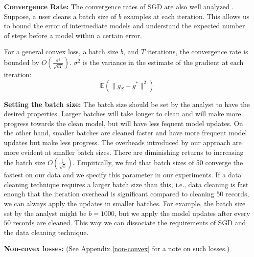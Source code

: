\vspace{0.25em}

\noindent\textbf{ Convergence Rate: } The convergence rates of SGD are also well analyzed \cite{dekel2012optimal,bertsekas2011incremental,zhao2014stochastic}. 
Suppose, a user cleans a batch size of $b$ examples at each iteration.
This allows us to bound the error of intermediate models and understand the expected number of steps before a model within a certain error. 

\begin{proposition}
For a general convex loss, a batch size $b$, and $T$ iterations, the convergence rate is bounded by $O(\frac{\sigma^2}{\sqrt{bT}})$. 
$\sigma^2$ is the variance in the estimate of the gradient at each iteration:
\[
\mathbb{E}(\|g_S - g^*\|^2)
\]
\end{proposition}

\vspace{0.25em}

\noindent\textbf{ Setting the batch size: } The batch size should be set by the analyst to have the desired properties.
Larger batches will take longer to clean and will make more progress towards the clean model, but will have less fequent model updates.
On the other hand, smaller batches are cleaned faster and have more frequent model updates but make less progress.
The overheads introduced by our approach are more evident at smaller batch sizes.
There are diminishing returns to increasing the batch size $O(\frac{1}{\sqrt{b}})$.
Empirically, we find that batch sizes of 50 converge the fastest on our data and we specify this parameter in our experiments.
If a data cleaning technique requires a larger batch size than this, i.e., data cleaning is fast enough that the iteration overhead is significant compared to cleaning 50 records, we can always apply the updates in smaller batches.
For example, the batch size set by the analyst might be $b=1000$, but we apply the model updates after every $50$ records are cleaned.
This way we can dissociate the requirements of SGD and the data cleaning technique.

\vspace{0.5em}

\noindent\textbf{ Non-covex losses: } (See Appendix \ref{non-convex} for a note on such losses.)


